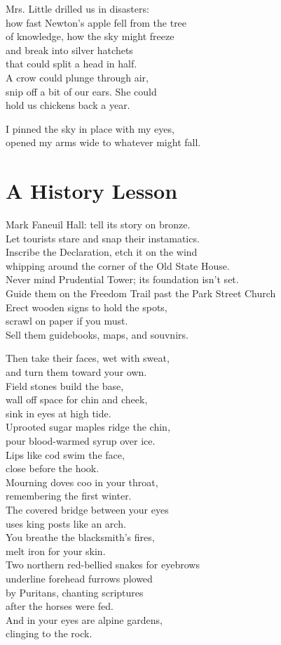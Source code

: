 \documentclass[twoside,10pt]{book}
\begin{document}
Mrs. Little drilled us in disasters:\\
how fast Newton's apple fell from the tree\\
of knowledge, how the sky might freeze\\
and break into silver hatchets\\
that could split a head in half.\\
A crow could plunge through air,\\
snip off a bit of our ears. She could\\
hold us chickens back a year.

I pinned the sky in place with my eyes,\\
opened my arms wide to whatever might fall.


\clearpage
\section{A History Lesson}

Mark Faneuil Hall: tell its story on bronze.\\
Let tourists stare and snap their instamatics.\\
Inscribe the Declaration, etch it on the wind\\
whipping around the corner of the Old State House.\\
Never mind Prudential Tower; its foundation isn't set.\\
Guide them on the Freedom Trail past the Park Street Church\\
Erect wooden signs to hold the spots,\\
scrawl on paper if you must.\\
Sell them guidebooks, maps, and souvnirs.

Then take their faces, wet with sweat,\\
and turn them toward your own.\\
Field stones build the base,\\
wall off space for chin and cheek,\\
sink in eyes at high tide.\\
Uprooted sugar maples ridge the chin,\\
pour blood-warmed syrup over ice.\\
Lips like cod swim the face,\\
close before the hook.\\
Mourning doves coo in your throat,\\
remembering the first winter.\\
The covered bridge between your eyes\\
uses king posts like an arch.\\
You breathe the blacksmith's fires,\\
melt iron for your skin.\\
Two northern red-bellied snakes for eyebrows\\
underline forehead furrows plowed\\
by Puritans, chanting scriptures\\
after the horses were fed.\\
And in your eyes are alpine gardens,\\
clinging to the rock.
\end{document}
